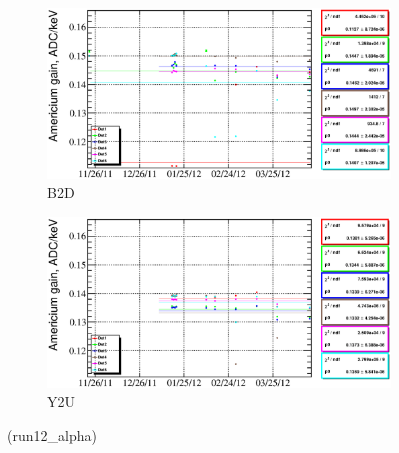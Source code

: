 \documentclass[a4paper,12pt]{article}
\begin{document}
\begin{figure}[htb]
\begin{subfigure}[t]{0.49\textwidth}
\includegraphics[width=\textwidth]{gfx/run12_alpha/B2D/c_chAmGain_by_day_B2D.eps}
\caption{B2D}
\end{subfigure}
%
\hfill
%
\begin{subfigure}[t]{0.49\textwidth}
\includegraphics[width=\textwidth]{gfx/run12_alpha/Y2U/c_chAmGain_by_day_Y2U.eps}
\caption{Y2U}
\end{subfigure}
%
\caption{\amgainlabel{} (run12\_alpha)}
\end{figure}
\end{document}
